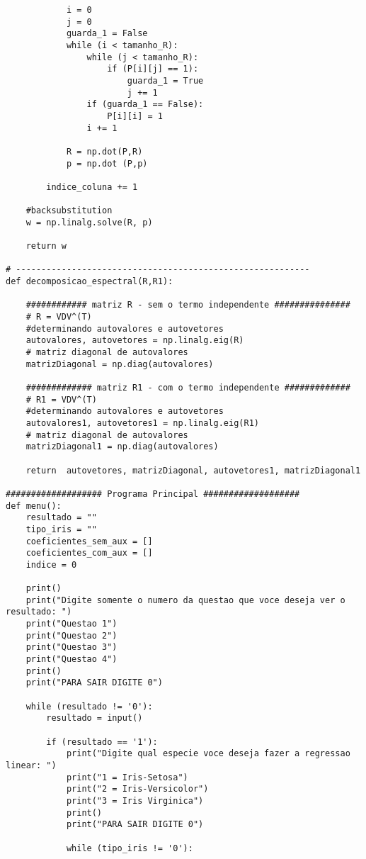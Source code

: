\documentclass[a4paper,12pt,twoside]{article}
\begin{document}
\begin{lstlisting}
            i = 0
            j = 0
            guarda_1 = False
            while (i < tamanho_R):
                while (j < tamanho_R):
                    if (P[i][j] == 1):
                        guarda_1 = True
                        j += 1
                if (guarda_1 == False):
                    P[i][i] = 1
                i += 1
            
            R = np.dot(P,R)
            p = np.dot (P,p)
       
        indice_coluna += 1 
        
    #backsubstitution
    w = np.linalg.solve(R, p)
      
    return w
           
# ----------------------------------------------------------
def decomposicao_espectral(R,R1):
    
    ############ matriz R - sem o termo independente ###############
    # R = VDV^(T)
    #determinando autovalores e autovetores
    autovalores, autovetores = np.linalg.eig(R) 
    # matriz diagonal de autovalores
    matrizDiagonal = np.diag(autovalores) 

    ############# matriz R1 - com o termo independente ############# 
    # R1 = VDV^(T)
    #determinando autovalores e autovetores
    autovalores1, autovetores1 = np.linalg.eig(R1) 
    # matriz diagonal de autovalores
    matrizDiagonal1 = np.diag(autovalores) 
    
    return  autovetores, matrizDiagonal, autovetores1, matrizDiagonal1

################### Programa Principal ###################
def menu():
    resultado = ""
    tipo_iris = ""
    coeficientes_sem_aux = []
    coeficientes_com_aux = []
    indice = 0
    
    print()
    print("Digite somente o numero da questao que voce deseja ver o resultado: ")
    print("Questao 1")
    print("Questao 2")
    print("Questao 3")
    print("Questao 4")
    print()
    print("PARA SAIR DIGITE 0")
    
    while (resultado != '0'):
        resultado = input()
    
        if (resultado == '1'):
            print("Digite qual especie voce deseja fazer a regressao linear: ")
            print("1 = Iris-Setosa")
            print("2 = Iris-Versicolor")
            print("3 = Iris Virginica")
            print()
            print("PARA SAIR DIGITE 0")
            
            while (tipo_iris != '0'):
             

\end{lstlisting}
\end{document}

